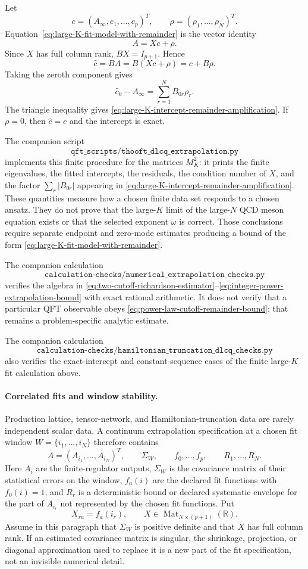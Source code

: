 Let
\[
  c=(A_\infty,c_1,\ldots,c_p)^T,
  \qquad
  \rho=(\rho_1,\ldots,\rho_N)^T .
\]
Equation~\eqref{eq:large-K-fit-model-with-remainder} is the vector identity
\[
  A=Xc+\rho .
\]
Since \(X\) has full column rank, \(BX=I_{p+1}\).  Hence
\[
  \widehat c
  =
  BA
  =
  B(Xc+\rho)
  =
  c+B\rho .
\]
Taking the zeroth component gives
\[
  \widehat c_0-A_\infty
  =
  \sum_{r=1}^N B_{0r}\rho_r .
\]
The triangle inequality gives
\eqref{eq:large-K-intercept-remainder-amplification}.  If \(\rho=0\), then
\(\widehat c=c\) and the intercept is exact.

The companion script
\[
  \texttt{qft\_scripts/thooft\_dlcq\_extrapolation.py}
\]
implements this finite procedure for the matrices \(M_K^2\): it prints the
finite eigenvalues, the fitted intercepts, the residuals, the condition number
of \(X\), and the factor
\(\sum_r |B_{0r}|\) appearing in
\eqref{eq:large-K-intercept-remainder-amplification}.  These quantities
measure how a chosen finite data set responds to a chosen ansatz.  They do not
prove that the large-\(K\) limit of the large-\(N\) QCD meson equation exists
or that the selected exponent \(\omega\) is correct.  Those conclusions require
separate endpoint and zero-mode estimates producing a bound of the form
\eqref{eq:large-K-fit-model-with-remainder}.

The companion calculation
\[
  \texttt{calculation-checks/numerical\_extrapolation\_checks.py}
\]
verifies the algebra in
\eqref{eq:two-cutoff-richardson-estimator}--\eqref{eq:integer-power-extrapolation-bound}
with exact rational arithmetic.  It does not verify that a particular QFT
observable obeys \eqref{eq:power-law-cutoff-remainder-bound}; that remains a
problem-specific analytic estimate.

The companion calculation
\[
  \texttt{calculation-checks/hamiltonian\_truncation\_dlcq\_checks.py}
\]
also verifies the exact-intercept and constant-sequence cases of
the finite large-\(K\) fit calculation above.

\paragraph{Correlated fits and window stability.}
Production lattice, tensor-network, and Hamiltonian-truncation data are rarely
independent scalar data.  A continuum extrapolation specification at a chosen fit
window \(W=\{i_1,\ldots,i_N\}\) therefore contains
\[
  A=(A_{i_1},\ldots,A_{i_N})^T,\qquad
  \Sigma_W,\qquad
  f_0,\ldots,f_p,\qquad
  R_1,\ldots,R_N .
\]
Here \(A_i\) are the finite-regulator outputs, \(\Sigma_W\) is the covariance
matrix of their statistical errors on the window, \(f_a(i)\) are the declared
fit functions with \(f_0(i)=1\), and \(R_r\) is a deterministic bound or
declared systematic envelope for the part of \(A_{i_r}\) not represented by
the chosen fit functions.  Put
\[
  X_{ra}=f_a(i_r),\qquad
  X\in\operatorname{Mat}_{N\times(p+1)}(\mathbb R).
\]
Assume in this paragraph that \(\Sigma_W\) is positive definite and that
\(X\) has full column rank.  If an estimated covariance matrix is singular,
the shrinkage, projection, or diagonal approximation used to replace it is a
new part of the fit specification, not an invisible numerical detail.

